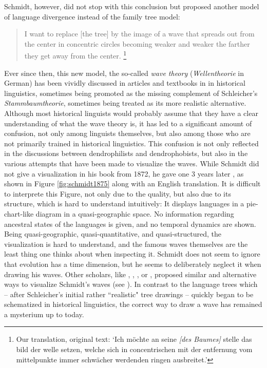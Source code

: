 \documentclass[svgnames,12pt]{scrartcl}
\begin{document}
{Schmidt, however, did not stop with this conclusion but proposed another model of language
divergence instead of the family tree model:

\begin{quote} \small I want to replace [the tree] by the image of a wave that spreads out from the
     center in concentric circles becoming weaker and weaker the farther they get away from the
     center. \citep[27]{Schmidt1872}\footnote{Our translation, original text: `Ich möchte an seine
     \emph{[des Baumes]} stelle das bild der welle setzen, welche sich in concentrischen mit der
     entfernung vom mittelpunkte immer schwächer werdenden ringen ausbreitet.'} 
\end{quote}

Ever since then, this new model, the
so-called \emph{wave theory} (\emph{Wellentheorie} in German) has been vividly discussed in articles and textbooks in
in historical linguistics, sometimes being promoted as the missing complement of Schleicher's
\emph{Stammbaumtheorie}, sometimes being treated as its more realistic alternative.
Although most historical linguists would probably assume that they have a clear understanding of
what the wave theory is, it has led to a significant amount of confusion, not only among linguists
themselves, but also among those who are not primarily trained in historical linguistics.
This confusion is not only reflected in the discussions between dendrophilists and dendrophobists,
but also in the various attempts that have been made to visualize the waves.
While Schmidt did
not give a visualization in his book from 1872, he gave one 3 years later \citep[199]{Schmidt1875},
as shown in Figure \ref{fig:schmidt1875} along with an English translation.
It is difficult to interprete this Figure, not only due to the quality, but also due to its
structure, which is hard to understand intuitively: It displays languages in a pie-chart-like
diagram in a quasi-geographic space. No information regarding ancestral states of the languages is
given, and no temporal dynamics are shown. Being quasi-geographic, quasi-quantitative, and
quasi-structured, the visualization is hard to understand, and the famous waves themselves are the
least thing one thinks about when inspecting it. Schmidt does not seem to ignore that evolution has
a time dimension, but he seems to deliberately neglect it when drawing his waves.
Other scholars, like \citet[93]{Hirt1905}, \citet[316]{Bloomfield1933}, \citet[134]{Meillet1908}, or
\citet[174]{Bonfante1931}, proposed similar and alternative ways to visualize Schmidt's waves (see
\citealt{Geisler2013}). In contrast to the language trees which – after Schleicher's initial rather
``realistic" tree drawings – quickly began to be schematized in historical linguistics, the correct
way to draw a wave has remained a mysterium up to today.

}
\end{document}
